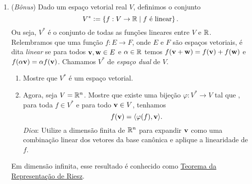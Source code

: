 \documentclass[leqno]{article}
\numberwithin{equation}{section}
\begin{document}
\begin{enumerate}
    \item (\textit{Bônus}) Dado um espaço vetorial real \( V \), definimos o conjunto
        \begin{equation*}
            V^{ * } \vcentcolon= \left\{ f : V \to \mathbb{R} \mid f \text{ é linear} \right\}
        .\end{equation*}
        Ou seja, \( V^{ * } \) é o conjunto de todas as funções lineares entre \( V \) e \( \mathbb{R} \).
        Relembramos que uma função \( f : E \to F \), onde \( E \) e \( F \) são espaços vetoriais, é dita \textit{linear} se para todos \( \mathbf{v}, \mathbf{w} \in E \) e \( \alpha \in \mathbb{R} \) temos \( f ( \mathbf{v} + \mathbf{w} ) = f ( \mathbf{v} ) + f ( \mathbf{w} ) \) e \( f ( \alpha \mathbf{v} ) = \alpha f ( \mathbf{v} ) \).
        Chamamos \( V^{ * } \) de \textit{espaço dual} de \( V \).
        \begin{enumerate}
            \item Mostre que \( V^{ * } \) é um espaço vetorial.
	    
	    \begin{sol} 
	    \end{sol} 
            \item Agora, seja \( V = \mathbb{R}^{ n } \).
                Mostre que existe uma bijeção \( \varphi : V^{ * } \to V \) tal que , para toda \( f \in V^{ * } \) e para todo \( \mathbf{v} \in V \), tenhamos
                \begin{equation*}
                    f(\mathbf{v}) = \langle\varphi(f), \mathbf{v}\rangle
                .\end{equation*} 
                \textit{Dica}: Utilize a dimensão finita de \( \mathbb{R}^{ n } \) para expandir \( \mathbf{v} \) como uma combinação linear dos vetores da base canônica e aplique a linearidade de \( f \).
	    
	    \begin{sol} 
	    \end{sol} 	
        \end{enumerate}
        Em dimensão infinita, esse resultado é conhecido como \href{https://en.wikipedia.org/wiki/Riesz_representation_theorem}{Teorema da Representação de Riesz}.
\end{enumerate}
\end{document}
